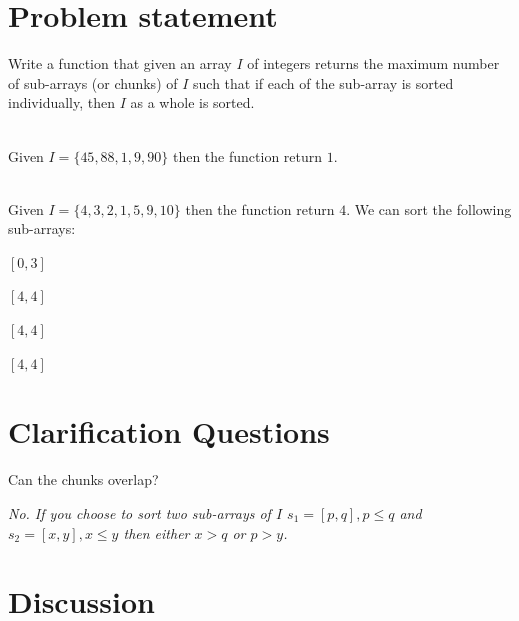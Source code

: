 \section{Problem statement}
\begin{exercise}
\label{example:max_num_chunks_sorted:exercice1}
Write a function that given an array $I$ of integers returns the maximum number of sub-arrays (or chunks) of $I$ 
such that if each of the sub-array is sorted individually, then $I$ as a whole is sorted.

    \begin{example}
        \label{example:max_num_chunks_sorted:example1}
        \hfill \\
        Given $I=\{45,88,1,9,90\}$ then the function return $1$.
        
    \end{example}

    \begin{example}
        \label{example:max_num_chunks_sorted:example2}
        \hfill \\
        Given $I=\{4,3,2,1,5,9,10\}$ then the function return $4$. We can sort the following sub-arrays:
        \begin{itemize*}
            \item $[0,3]$
            \item $[4,4]$
            \item $[4,4]$
            \item $[4,4]$
        \end{itemize*}
    \end{example}
\end{exercise}

\section{Clarification Questions}

\begin{QandA}
    \item Can the chunks overlap? 
    \begin{answered}
        \textit{No. If you choose to sort two sub-arrays of $I$ $s_1=[p,q], p\leq q$ and $s_2=[x,y], x\leq y$ then either $x > q$ or $p>y$.}
    \end{answered}
    
\end{QandA}

\section{Discussion}
\label{max_num_chunks_sorted:sec:discussion}

